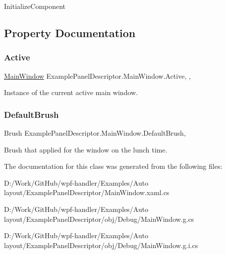 Initialize\+Component 



\subsection{Property Documentation}
\mbox{\label{class_example_panel_descriptor_1_1_main_window_a82ef771c382f2dd1278d2e8190c3fe43}} 
\subsubsection{\texorpdfstring{Active}{Active}}
{\footnotesize\ttfamily \mbox{\hyperlink{class_example_panel_descriptor_1_1_main_window}{Main\+Window}} Example\+Panel\+Descriptor.\+Main\+Window.\+Active\hspace{0.3cm}{\ttfamily [static]}, {\ttfamily [get]}, {}}



Instance of the current active main window. 

\mbox{\label{class_example_panel_descriptor_1_1_main_window_aae5508e66cf2fc08d9c4b4920d32e8c9}} 
\subsubsection{\texorpdfstring{Default\+Brush}{DefaultBrush}}
{\footnotesize\ttfamily Brush Example\+Panel\+Descriptor.\+Main\+Window.\+Default\+Brush\hspace{0.3cm}{\ttfamily [get]}, {}}



Brush that applied for the window on the lunch time. 



The documentation for this class was generated from the following files\+:\begin{DoxyCompactItemize}
\item 
D\+:/\+Work/\+Git\+Hub/wpf-\/handler/\+Examples/\+Auto layout/\+Example\+Panel\+Descriptor/Main\+Window.\+xaml.\+cs\item 
D\+:/\+Work/\+Git\+Hub/wpf-\/handler/\+Examples/\+Auto layout/\+Example\+Panel\+Descriptor/obj/\+Debug/Main\+Window.\+g.\+cs\item 
D\+:/\+Work/\+Git\+Hub/wpf-\/handler/\+Examples/\+Auto layout/\+Example\+Panel\+Descriptor/obj/\+Debug/Main\+Window.\+g.\+i.\+cs\end{DoxyCompactItemize}

